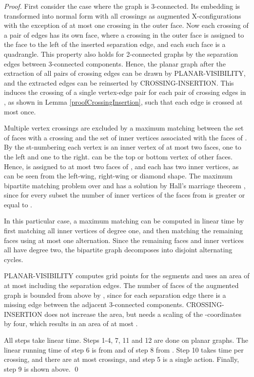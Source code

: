 \documentclass[runningheads]{llncs}
\begin{document}
\begin{proof}
First consider the case where the graph  is 3-connected. Its
embedding is transformed into normal form with all crossings as
augmented X-configurations with the exception of at most one
crossing in the outer face. Now each crossing of a pair of edges has
its own face, where a crossing in the outer face is assigned to the
face to the left of the inserted separation edge, and each such face
is a quadrangle. This property also holds for 2-connected graphs by
the separation edges between 3-connected components. Hence, the
planar graph  after the extraction of all pairs of crossing edges
can be drawn by PLANAR-VISIBILITY, and the extracted edges can be
reinserted by CROSSING-INSERTION. This induces the crossing of a
single vertex-edge pair for each pair of crossing edges in , as
shown in Lemma \ref{proofCrossingInsertion}, such that each edge is
crossed at most once.

Multiple vertex crossings are excluded by a maximum matching between
the set of faces  with a crossing and the set of
 inner vertices  associated with the faces of .
By the st-numbering each vertex   is an inner vertex  of at most
two faces, one to the left and one to the right.  can be the top
or bottom vertex of  other faces. Hence,  is assigned to at most
two faces of , and each  has two inner vertices, as can
be seen from the left-wing, right-wing or diamond shape. The maximum
bipartite matching problem over  and  has a solution by Hall's
marriage theorem \cite{h-matching-35}, since for every subset  the number of inner vertices  of the faces from
 is greater or equal to .

In this particular case, a maximum matching can be computed in
linear time by first matching all inner vertices of degree one, and
then matching the remaining faces using at most one alternation.
Since the remaining faces and inner vertices all have degree two,
the bipartite graph decomposes into disjoint alternating cycles.

PLANAR-VISIBILITY computes grid points for the segments and uses an
area of at most  including the separation
edges. The number of faces of the augmented graph  is bounded
from above by , since for each separation edge there is a
missing edge between the adjacent 3-connected components.
CROSSING-INSERTION does not increase the area, but needs a scaling
of the -coordinates by four, which results in an area of at most
.

All steps take linear time. Steps 1-4, 7, 11 and 12 are done on
planar graphs. The linear running time of step 6 is from
\cite{abk-sld3c-13} and of step 8 from
\cite{dett-gdavg-99,rt-rplbopg-86, TT-vrpg-86}. Step 10 takes
 time per crossing, and there are at most 
crossings, and step 5 is a single action. Finally, step 9 is shown
above. \qed

\end{proof}
\end{document}
